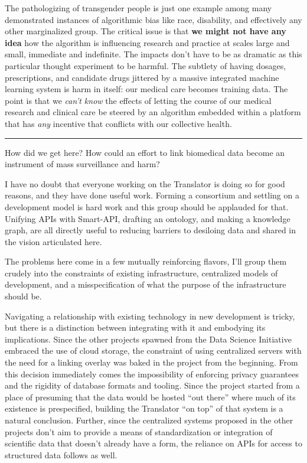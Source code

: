\documentclass[11pt]{article}
\begin{document}
\begin{multicols}{2}
The pathologizing of transgender people is just one example among many
demonstrated instances of algorithmic bias like race, disability, and
effectively any other marginalized group. The critical issue is that
\textbf{we might not have any idea} how the algorithm is influencing
research and practice at scales large and small, immediate and
indefinite. The impacts don't have to be as dramatic as this particular
thought experiment to be harmful. The subtlety of having dosages,
prescriptions, and candidate drugs jittered by a massive integrated
machine learning system is harm in itself: our medical care becomes
training data. The point is that we \emph{can't know} the effects of
letting the course of our medical research and clinical care be steered
by an algorithm embedded within a platform that has \emph{any} incentive
that conflicts with our collective health.

\begin{center}\rule{0.5\linewidth}{0.5pt}\end{center}

How did we get here? How could an effort to link biomedical data become
an instrument of mass surveillance and harm?

I have no doubt that everyone working on the Translator is doing so for
good reasons, and they have done useful work. Forming a consortium and
settling on a development model is hard work and this group should be
applauded for that. Unifying APIs with Smart-API, drafting an ontology,
and making a knowledge graph, are all directly useful to reducing
barriers to desiloing data and shared in the vision articulated here.

The problems here come in a few mutually reinforcing flavors, I'll group
them crudely into the constraints of existing infrastructure,
centralized models of development, and a misspecification of what the
purpose of the infrastructure should be.

Navigating a relationship with existing technology in new development is
tricky, but there is a distinction between integrating with it and
embodying its implications. Since the other projects spawned from the
Data Science Initiative embraced the use of cloud storage, the
constraint of using centralized servers with the need for a linking
overlay was baked in the project from the beginning. From this decision
immediately comes the impossibility of enforcing privacy guarantees and
the rigidity of database formats and tooling. Since the project started
from a place of presuming that the data would be hosted ``out there''
where much of its existence is prespecified, building the Translator
``on top'' of that system is a natural conclusion. Further, since the
centralized systems proposed in the other projects don't aim to provide
a means of standardization or integration of scientific data that
doesn't already have a form, the reliance on APIs for access to
structured data follows as well.


\end{multicols}
\end{document}
